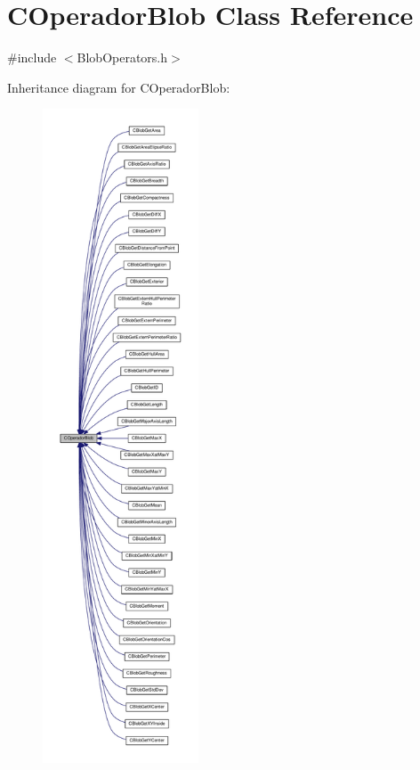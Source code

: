 \hypertarget{classCOperadorBlob}{\section{C\-Operador\-Blob Class Reference}
\label{classCOperadorBlob}
}


{\ttfamily \#include $<$Blob\-Operators.\-h$>$}



Inheritance diagram for C\-Operador\-Blob\-:\nopagebreak
\begin{figure}[H]
\begin{center}
\leavevmode
\includegraphics[height=550pt]{classCOperadorBlob__inherit__graph}
\end{center}
\end{figure}
